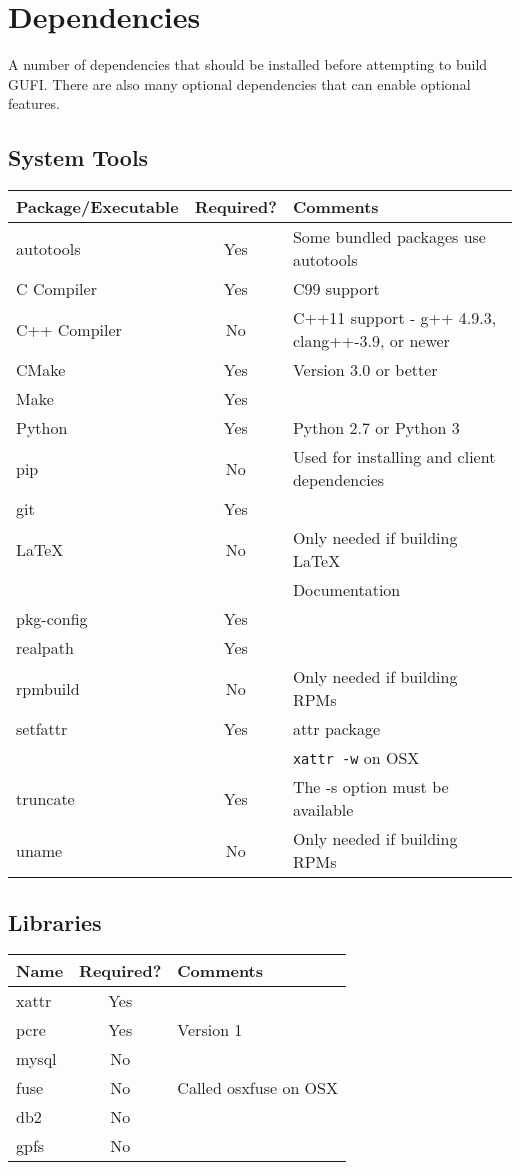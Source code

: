 \section{Dependencies}
A number of dependencies that should be installed before attempting to
build GUFI. There are also many optional dependencies that can enable
optional features.

\subsection{System Tools}
\begin{tabularx}{\textwidth}{| l | c | X | }
  \hline
  Package/Executable & Required? & Comments \\
  \hline
  autotools & Yes & Some bundled packages use autotools \\
  \hline
  C Compiler & Yes & C99 support \\
  \hline
  C++ Compiler & No & C++11 support - g++ 4.9.3, clang++-3.9, or newer
  \hfill \\
  \hline
  CMake & Yes & Version 3.0 or better \\
  \hline
  Make & Yes & \\
  \hline
  Python & Yes & Python 2.7 or Python 3 \\
  \hline
  pip & No & Used for installing and client dependencies \\
  \hline
  git & Yes & \\
  \hline
  \LaTeX & No & Only needed if building \LaTeX \hfill \\
  & & Documentation \hfill \\
  \hline
  pkg-config & Yes & \\
  \hline
  realpath & Yes & \\
  \hline
  rpmbuild & No & Only needed if building RPMs \\
  \hline
  setfattr & Yes & attr package \\
  & & \texttt{xattr -w} on OSX \\
  \hline
  truncate & Yes & The -s option must be available \\
  \hline
  uname & No & Only needed if building RPMs \\
  \hline
\end{tabularx}

\subsection{Libraries}
\begin{tabularx}{\textwidth}{| l | c | X |}
  \hline
  Name & Required? & Comments \\
  \hline
  xattr & Yes & \\
  \hline
  pcre & Yes & Version 1 \\
  \hline
  mysql & No & \\
  \hline
  fuse & No & Called osxfuse on OSX \\
  \hline
  db2 & No & \\
  \hline
  gpfs & No & \\
  \hline
\end{tabularx}

